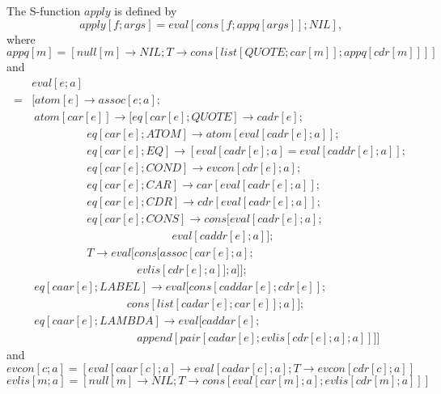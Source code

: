 \documentclass[11pt, a4paper]{article}
\begin{document}
The S-function $apply$ is defined by
$$ apply[f; args] = eval[cons[f; appq[args]]; NIL] \text{,} $$
where
$$ appq[m] = [null[m] \to NIL; T \to cons[list[QUOTE; car[m]]; appq[cdr[m]]]] $$
and
\begin{align*}
    &eval[e; a]                                                               \\
  = &[atom[e] \to assoc[e; a];                                                \\
    &\ atom[car[e]] \to [eq[car[e]; QUOTE] \to cadr[e];                       \\
      &\ \ \ \ \ \ \ \ \ \ \ \ \ \ \ \ \ \ \ \ \ \
                         eq[car[e]; ATOM]  \to atom[eval[cadr[e]; a]];        \\
      &\ \ \ \ \ \ \ \ \ \ \ \ \ \ \ \ \ \ \ \ \ \
                   eq[car[e]; EQ] \to [eval[cadr[e]; a] = eval[caddr[e]; a]]; \\
      &\ \ \ \ \ \ \ \ \ \ \ \ \ \ \ \ \ \ \ \ \ \
                         eq[car[e]; COND] \to evcon[cdr[e]; a];               \\
      &\ \ \ \ \ \ \ \ \ \ \ \ \ \ \ \ \ \ \ \ \ \
                         eq[car[e]; CAR] \to car[eval[cadr[e]; a]];           \\
      &\ \ \ \ \ \ \ \ \ \ \ \ \ \ \ \ \ \ \ \ \ \
                         eq[car[e]; CDR] \to cdr[eval[cadr[e]; a]];           \\
      &\ \ \ \ \ \ \ \ \ \ \ \ \ \ \ \ \ \ \ \ \ \
                         eq[car[e]; CONS] \to cons[eval[cadr[e]; a];          \\
      &\ \ \ \ \ \ \ \ \ \ \ \ \ \ \ \ \ \ \ \ \ \ \ \ \ \ \ \ \ \ \ \ \ \ \ \ \
                    \ \ \ \ \ \ \ \ \ \ \ \ \ \ \ \ \ \ \ eval[caddr[e]; a]]; \\
      &\ \ \ \ \ \ \ \ \ \ \ \ \ \ \ \ \ \ \ \ \ \
                         T \to eval[cons[assoc[car[e]; a];                    \\
      &\ \ \ \ \ \ \ \ \ \ \ \ \ \ \ \ \ \ \ \ \ \ \ \ \ \ \ \ \ \ \ \ \ \ \ \ \
                               \ \ \ \ \ evlis[cdr[e]; a]]; a]];              \\
    &\ eq[caar[e]; LABEL] \to eval[cons[caddar[e]; cdr[e]];                   \\
      &\ \ \ \ \ \ \ \ \ \ \ \ \ \ \ \ \ \ \ \ \ \ \ \ \ \ \ \ \ \ \ \ \ \ \ \ \
                                 \ cons[list[cadar[e]; car[e]]; a]];          \\
    &\ eq[caar[e]; LAMBDA] \to eval[caddar[e];                                \\
      &\ \ \ \ \ \ \ \ \ \ \ \ \ \ \ \ \ \ \ \ \ \ \ \ \ \ \ \ \ \ \ \ \ \ \ \ \
                         \ \ \ \ \ append[pair[cadar[e]; evlis[cdr[e]; a]; a]]]]
\end{align*}
and
$$ evcon[c; a] = [eval[caar[c]; a] \to eval[cadar[c]; a]; T \to evcon[cdr[c];
    a]] $$
$$ evlis[m; a] = [null[m] \to NIL; T \to cons[eval[car[m]; a]; evlis[cdr[m];
      a]]] $$
\end{document}
